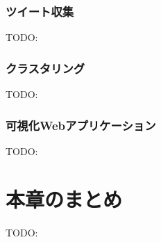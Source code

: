 \subsubsection{ツイート収集}
TODO:
\subsubsection{クラスタリング}
TODO:

\subsubsection{可視化Webアプリケーション}
TODO:

\newpage

\section{本章のまとめ}
TODO:




\newpage
